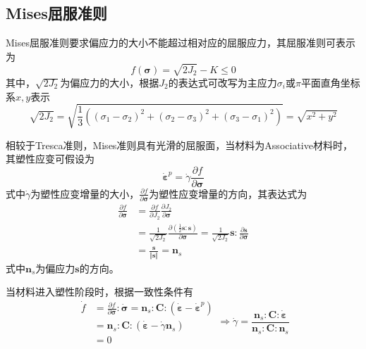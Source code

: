 \subsection{Mises屈服准则}
Mises屈服准则要求偏应力的大小不能超过相对应的屈服应力，其屈服准则可表示为
\begin{equation}
    f(\boldsymbol \sigma) = \sqrt{2J_2} - K \le 0
\end{equation}
其中，$\sqrt{2J_2}$为偏应力的大小，根据$J_2$的表达式可改写为主应力$\sigma_i$或$\pi$平面直角坐标系$x,y$表示
\begin{equation}
    \sqrt{2J_2} = \sqrt{\frac{1}{3}((\sigma_1-\sigma_2)^2 + (\sigma_2-\sigma_3)^2 + (\sigma_3-\sigma_1)^2)} = \sqrt{x^2+y^2}
\end{equation}\par
相较于Tresca准则，Mises准则具有光滑的屈服面，当材料为Associative材料时，其塑性应变可假设为
\begin{equation}
    \dot{\boldsymbol \varepsilon}^p = \dot \gamma \frac{\partial f}{\partial \boldsymbol \sigma}
\end{equation}
式中$\dot \gamma$为塑性应变增量的大小，$\frac{\partial f}{\partial \boldsymbol \sigma}$为塑性应变增量的方向，其表达式为
\begin{equation}
    \begin{split}
        \frac{\partial f}{\partial \boldsymbol \sigma} &= \frac{\partial f}{\partial J_2} \frac{\partial J_2}{\partial \boldsymbol \sigma} \\
                                                       &= \frac{1}{\sqrt{2J_2}} \frac{\partial (\frac{1}{2} \boldsymbol s: \boldsymbol s)}{\partial \boldsymbol \sigma} = \frac{1}{\sqrt{2J_2}} \boldsymbol s: \frac{\partial \boldsymbol s}{\partial \boldsymbol \sigma} \\ 
                                                       &= \frac{\boldsymbol s}{\Vert \boldsymbol s \Vert} = \boldsymbol n_s
    \end{split}
\end{equation}
式中$\boldsymbol n_s$为偏应力$\boldsymbol s$的方向。\par
当材料进入塑性阶段时，根据一致性条件有
\begin{equation}
    \begin{split}
        \dot f &= \frac{\partial f}{\partial \boldsymbol \sigma} : \dot{\boldsymbol \sigma} = \boldsymbol n_s : \boldsymbol C : (\dot{\boldsymbol \varepsilon}-\dot{\boldsymbol \varepsilon}^p) \\
               &= \boldsymbol n_s : \boldsymbol C : (\dot{\boldsymbol \varepsilon}-\dot \gamma \boldsymbol n_s) \\
               &=0
    \end{split} \Rightarrow
    \dot \gamma = \frac{\boldsymbol n_s : \boldsymbol C : \dot{\boldsymbol \varepsilon}}{\boldsymbol n_s : \boldsymbol C : \boldsymbol n_s}
\end{equation}
